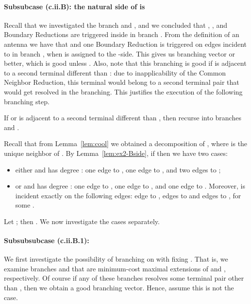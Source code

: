 \paragraph*{Subsubcase (c.ii.B): the natural side of  is }

Recall that we investigated the branch  and , and we concluded that , , and  Boundary Reductions are triggered inside  in branch . From the definition of an antenna we have that  and one Boundary Reduction is triggered on edges incident to  in branch , when  is assigned to the -side. This gives us branching vector  or better, which is good unless . 
Also, note that this branching is good if  is adjacent to a second terminal different than : due to inapplicability
of the Common Neighbor Reduction, this terminal would belong to a second terminal pair that would get resolved
in the branching.
This justifies the execution of the following branching step.

\begin{branching}
If  or  is adjacent to a second terminal different than ,
then recurse into branches  and .
\end{branching}



Recall that from Lemma~\ref{lem:cool} we obtained a decomposition  of , where  is the unique neighbor of . By Lemma~\ref{lem:ex2-Bside}, if  then we have two cases:
\begin{itemize}
\item either  and  has degree : one edge to , one edge to , and two edges to ;
\item or  and  has degree : one edge to , one edge to , and one edge to . Moreover,  is incident exactly on the following edges:  edge to ,  edges to  and  edges to , for some .
\end{itemize}
Let ; then . We now investigate the cases separately.






\paragraph*{Subsubsubcase (c.ii.B.1): }

We first investigate the possibility of branching on  with fixing . That is, we examine branches  and  that are minimum-cost maximal extensions of  and , respectively. Of course if any of these branches resolves some terminal pair other than , then we obtain a good branching vector. Hence, assume this is not the case. 

